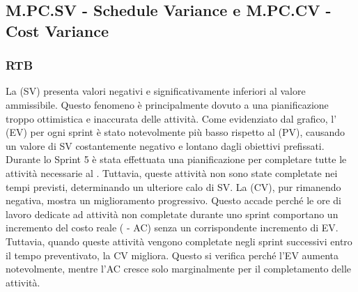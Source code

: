 \subsection{M.PC.SV - Schedule Variance e M.PC.CV - Cost Variance}

\subsubsection{RTB}
La  (SV) presenta valori negativi e significativamente inferiori al valore ammissibile. 
Questo fenomeno è principalmente dovuto a una pianificazione troppo ottimistica e inaccurata delle attività. 
Come evidenziato dal grafico, l' (EV) per ogni sprint è stato notevolmente più basso rispetto al  (PV), causando un valore di SV costantemente negativo e lontano dagli obiettivi prefissati. 
Durante lo Sprint 5 è stata effettuata una pianificazione per completare tutte le attività necessarie al . 
Tuttavia, queste attività non sono state completate nei tempi previsti, determinando un ulteriore calo di SV.
La  (CV), pur rimanendo negativa, mostra un miglioramento progressivo. Questo accade perché le ore di lavoro dedicate ad attività non completate durante uno sprint comportano un incremento del costo reale ( - AC) senza un corrispondente incremento di EV.
Tuttavia, quando queste attività vengono completate negli sprint successivi entro il tempo preventivato, la CV migliora. 
Questo si verifica perché l'EV aumenta notevolmente, mentre l'AC cresce solo marginalmente per il completamento delle attività.